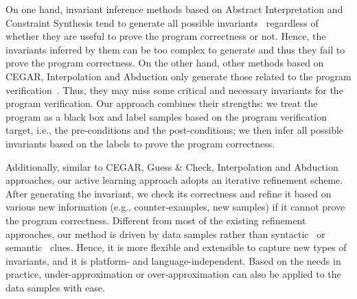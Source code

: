 On one hand, invariant inference methods based on Abstract Interpretation and Constraint Synthesis
tend to generate all possible invariants~\cite{mine2006octagon,vincent2009subpolyhedra,ashutosh2009invgen} regardless of
whether they are useful to prove the program correctness or not.
Hence, the invariants inferred by them can be too complex to generate
and thus they fail to prove the program correctness.
On the other hand, other methods based on CEGAR, Interpolation and Abduction
only generate those related to the program verification~\cite{isil2013inductive}.
Thus, they may miss some critical and necessary invariants for the program verification.
Our approach combines their strengths:
we treat the program as a black box
and label samples based on the program verification target,
i.e., the pre-conditions and the post-conditions;
we then infer all possible invariants based on the labels
to prove the program correctness.

Additionally, similar to CEGAR, Guess \& Check, Interpolation and Abduction approaches,
our active learning approach adopts an iterative refinement scheme.
After generating the invariant, we check its correctness and refine it
based on various new information (e.g., counter-examples, new samples)
if it cannot prove the program correctness.
Different from most of the existing refinement approaches,
our method is driven by data samples
rather than syntactic~\cite{cormac2001houdini} or semantic~\cite{ashutosh2009invgen,isil2013inductive} clues.
Hence, it is more flexible and extensible to capture new types of invariants,
and it is platform- and language-independent.
Based on the needs in practice, under-approximation or over-approximation
can also be applied to the data samples with ease.

